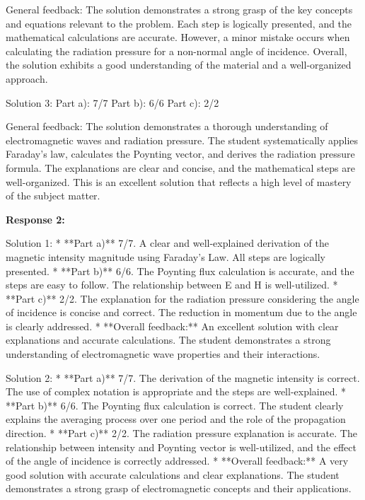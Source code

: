 \documentclass[a4paper,11pt]{article}
\begin{document}
General feedback: The solution demonstrates a strong grasp of the key concepts and equations relevant to the problem. Each step is logically presented, and the mathematical calculations are accurate. However, a minor mistake occurs when calculating the radiation pressure for a non-normal angle of incidence. Overall, the solution exhibits a good understanding of the material and a well-organized approach.

Solution 3:
Part a): 7/7
Part b): 6/6
Part c): 2/2

General feedback: The solution demonstrates a thorough understanding of electromagnetic waves and radiation pressure. The student systematically applies Faraday's law, calculates the Poynting vector, and derives the radiation pressure formula. The explanations are clear and concise, and the mathematical steps are well-organized. This is an excellent solution that reflects a high level of mastery of the subject matter.

\bigskip    
\textbf{Response 2:}

Solution 1:
* **Part a)** 7/7. A clear and well-explained derivation of the magnetic intensity magnitude using Faraday's Law. All steps are logically presented.
* **Part b)** 6/6. The Poynting flux calculation is accurate, and the steps are easy to follow. The relationship between E and H is well-utilized.
* **Part c)** 2/2. The explanation for the radiation pressure considering the angle of incidence is concise and correct. The reduction in momentum due to the angle is clearly addressed.
* **Overall feedback:** An excellent solution with clear explanations and accurate calculations. The student demonstrates a strong understanding of electromagnetic wave properties and their interactions.

Solution 2:
* **Part a)** 7/7. The derivation of the magnetic intensity is correct. The use of complex notation is appropriate and the steps are well-explained.
* **Part b)** 6/6. The Poynting flux calculation is correct. The student clearly explains the averaging process over one period and the role of the propagation direction.
* **Part c)** 2/2. The radiation pressure explanation is accurate. The relationship between intensity and Poynting vector is well-utilized, and the effect of the angle of incidence is correctly addressed.
* **Overall feedback:** A very good solution with accurate calculations and clear explanations. The student demonstrates a strong grasp of electromagnetic concepts and their applications.
\end{document}
